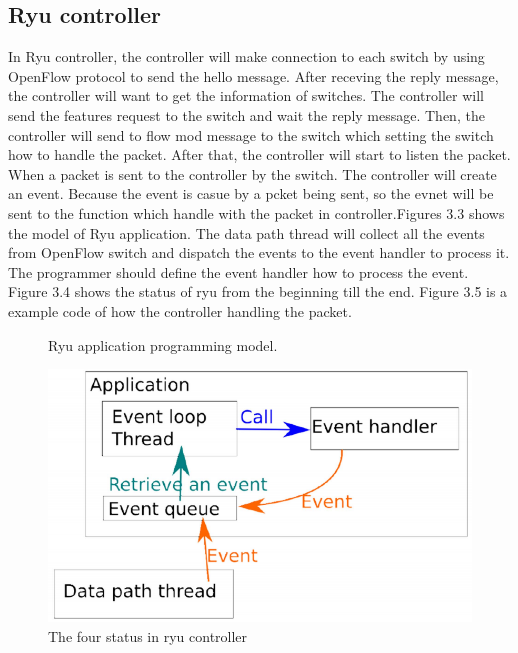 \documentclass[a4paper,12pt]{report}
\begin{document}
\begin{large}
	    \section{Ryu controller}
	    \qquad In Ryu controller, the controller will make connection to each switch by using OpenFlow protocol to send the hello message. After receving the reply message, the controller will want to get the information of switches. The controller will send the features request to the switch and wait the reply message. Then, the controller will send to flow mod message to the switch which setting the switch how to handle the packet. After that, the controller will start to listen the packet. When a packet is sent to the controller by the switch. The controller will create an event. Because the event is casue by a pcket being sent, so the evnet will be sent to the function which handle with the packet in controller.Figures 3.3 shows the model of Ryu application. The data path thread will collect all the events from OpenFlow switch and dispatch the events to the event handler to process it. The programmer should define the event handler how to process the event. Figure 3.4 shows the status of ryu from the beginning till the end. Figure 3.5 is a example code of how the controller handling the packet.
	     \begin{figure}[p]
	          \caption{Ryu application programming model.}
	          \centering
	            \includegraphics[width=1.0\textwidth]{ryu_model.png}
	          \caption{The four status in ryu controller}

\end{figure}
\end{large}
\end{document}
